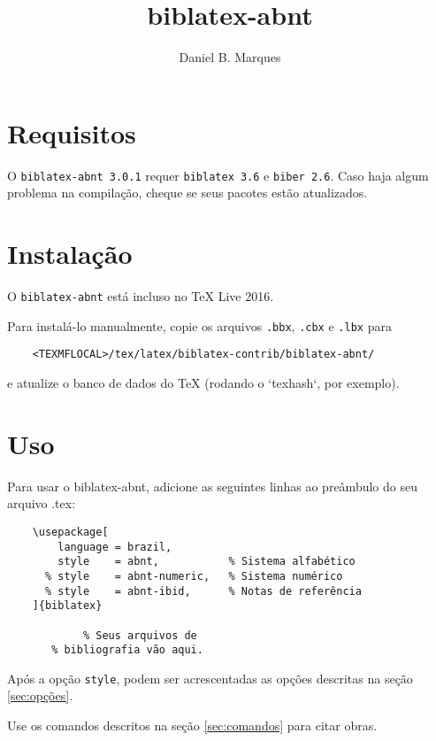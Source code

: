 \documentclass[a4paper]{article}
\title{biblatex-abnt \version}
\author{Daniel B. Marques}
\newcommand{\version}{3.0.1}
\newcommand{\requirements}{\texttt{biblatex 3.6} e \texttt{biber 2.6}}
\begin{document}

\maketitle

\tableofcontents

\clearpage
\section{Requisitos}%

O \texttt{biblatex-abnt \version} requer \requirements. Caso haja algum
problema na compilação, cheque se seus pacotes estão atualizados.

\section{Instalação}%

O \texttt{biblatex-abnt} está incluso no TeX Live 2016.

Para instalá-lo manualmente, copie os arquivos \texttt{.bbx}, \texttt{.cbx} e
\texttt{.lbx} para
\begin{verbatim}
    <TEXMFLOCAL>/tex/latex/biblatex-contrib/biblatex-abnt/
\end{verbatim}
e atualize o banco de dados do TeX (rodando o `texhash`, por exemplo).

\section{Uso}%

Para usar o {biblatex-abnt}, adicione as seguintes linhas ao preâmbulo do seu
arquivo {.tex}:

\begin{verbatim}
    \usepackage[
        language = brazil,
        style    = abnt,           % Sistema alfabético
      % style    = abnt-numeric,   % Sistema numérico
      % style    = abnt-ibid,      % Notas de referência
    ]{biblatex}

            % Seus arquivos de
       % bibliografia vão aqui.
\end{verbatim}

Após a opção \texttt{style}, podem ser acrescentadas
as opções descritas na seção \ref{sec:opções}.

Use os comandos descritos na seção \ref{sec:comandos} para citar obras.
\end{document}
